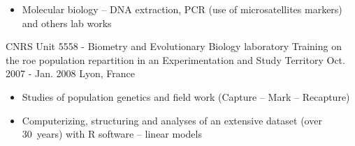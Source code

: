 \begin{cventries}
{\begin{cvitems}
\begin{itemize}[label=$\bullet$,topsep=2pt]
{        report in English}
          \item {Molecular biology – DNA extraction, PCR (use of microsatellites markers) and others lab works}
              \end{itemize}
\end{cvitems} 
  }
        \cventry
  {CNRS Unit 5558 - Biometry and Evolutionary Biology laboratory}
  {Training on the roe population repartition in an Experimentation and Study Territory}
  {Oct. 2007 - Jan. 2008}
    {Lyon, France}
{
  \begin{cvitems}
              \begin{itemize}[label=$\bullet$,topsep=2pt]
    \item {Studies of population genetics and field work (Capture – Mark – Recapture)}
    \item {Computerizing, structuring and analyses of an extensive dataset (over 30 years) with R software – linear models}
              \end{itemize}
\end{cvitems} 
  }
\end{cventries}
